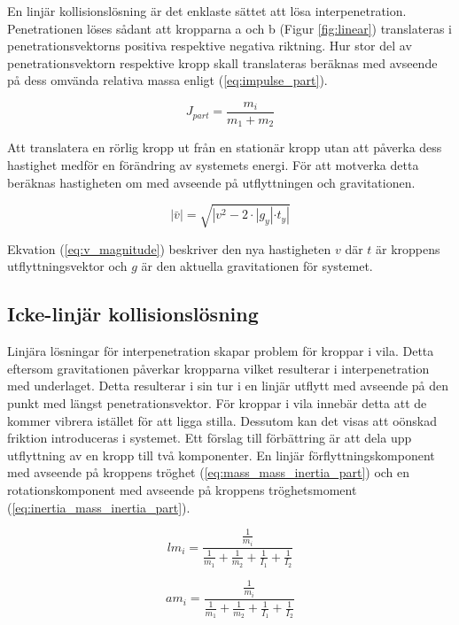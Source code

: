 \documentclass[a4paper,12pt,twopage,swedish]{article}
\begin{document}
En linjär kollisionslösning är det enklaste sättet att lösa interpenetration. Penetrationen löses sådant att kropparna a och b (Figur \ref{fig:linear}) translateras i penetrationsvektorns positiva respektive negativa riktning. Hur stor del av penetrationsvektorn respektive kropp skall translateras beräknas med avseende på dess omvända relativa massa enligt (\ref{eq:impulse_part}).

\begin{equation}\label{eq:impulse_part}
	J_{part} = \frac{m_i}{m_1+m_2}
\end{equation}

Att translatera en rörlig kropp ut från en stationär kropp utan att påverka dess hastighet medför en förändring av systemets energi. För att motverka detta beräknas hastigheten om med avseende på utflyttningen och gravitationen.

\begin{equation}\label{eq:v_magnitude}
	|\bar{v}| = \sqrt{|v^{2}-2\cdot|g_y| \cdot t_y|}
\end{equation}

Ekvation (\ref{eq:v_magnitude}) beskriver den nya hastigheten $v$ där $t$ är kroppens utflyttningsvektor och $g$ är den aktuella gravitationen för systemet.

\subsection{Icke-linjär kollisionslösning}
Linjära lösningar för interpenetration skapar problem för kroppar i vila. Detta eftersom gravitationen påverkar kropparna vilket resulterar i interpenetration med underlaget. Detta resulterar i sin tur i en linjär utflytt med avseende på den punkt med längst penetrationsvektor. För kroppar i vila innebär detta att de kommer vibrera istället för att ligga stilla. Dessutom kan det visas att oönskad friktion introduceras i systemet. Ett förslag till förbättring är att dela upp utflyttning av en kropp till två komponenter. En linjär förflyttningskomponent med avseende på kroppens tröghet (\ref{eq:mass_mass_inertia_part}) och en rotationskomponent med avseende på kroppens tröghetsmoment (\ref{eq:inertia_mass_inertia_part}).

\begin{equation}\label{eq:mass_mass_inertia_part}
	lm_i = \frac{\frac{1}{m_i}}{\frac{1}{m_1} + \frac{1}{m_2} + \frac{1}{I_1} + \frac{1}{I_2}}
\end{equation}

\begin{equation}\label{eq:inertia_mass_inertia_part}
 	am_i = \frac{\frac{1}{m_i}}{\frac{1}{m_1} + \frac{1}{m_2} + \frac{1}{I_1} + \frac{1}{I_2}}
\end{equation}
\end{document}
